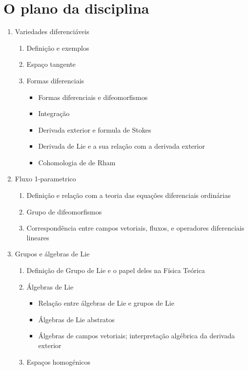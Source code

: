 \documentclass[12pt]{article}
\begin{document}
\eject

\section{O plano da disciplina}
\begin{enumerate}
\item Variedades diferenciáveis
   \begin{enumerate}
   \item Definição e exemplos
   \item Espaço tangente
   \item Formas diferenciais
      \begin{itemize}
      \item Formas diferenciais e difeomorfismos
      \item Integração
      \item Derivada exterior e formula de Stokes
      \item Derivada de Lie e a sua relação com a derivada exterior
      \item Cohomologia de de Rham
      \end{itemize}
   \end{enumerate}
\item Fluxo 1-parametrico
   \begin{enumerate}
   \item Definição e relação com a teoria das equações diferenciais ordinárias
   \item Grupo de difeomorfismos
   \item Correspondência entre campos vetoriais, fluxos, e operadores 
      diferenciais lineares
   \end{enumerate}
\item Grupos e álgebras de Lie
   \begin{enumerate}
   \item Definição de Grupo de Lie e o papel deles na Física Teórica
   \item Álgebras de Lie
      \begin{itemize}
      \item Relação entre álgebras de Lie e grupos de Lie
      \item Álgebras de Lie abstratos
      \item Álgebras de campos vetoriais; interpretação algébrica da derivada
         exterior
      \end{itemize}
   \item Espaços homogénicos
   \end{enumerate}

\end{enumerate}
\end{document}
